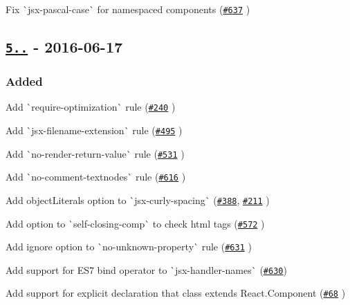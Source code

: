 \begin{DoxyItemize}
\item Fix \`{}jsx-\/pascal-\/case\`{} for namespaced components (\href{https://github.com/yannickcr/eslint-plugin-react/issues/637}{\tt \#637} )
\end{DoxyItemize}

\subsection*{\href{https://github.com/yannickcr/eslint-plugin-react/compare/v5.1.1...v5.2.0}{\tt 5..} -\/ 2016-\/06-\/17}

\subsubsection*{Added}


\begin{DoxyItemize}
\item Add \`{}require-\/optimization\`{} rule (\href{https://github.com/yannickcr/eslint-plugin-react/issues/240}{\tt \#240} )
\item Add \`{}jsx-\/filename-\/extension\`{} rule (\href{https://github.com/yannickcr/eslint-plugin-react/issues/495}{\tt \#495} )
\item Add \`{}no-\/render-\/return-\/value\`{} rule (\href{https://github.com/yannickcr/eslint-plugin-react/issues/531}{\tt \#531} )
\item Add \`{}no-\/comment-\/textnodes\`{} rule (\href{https://github.com/yannickcr/eslint-plugin-react/pull/616}{\tt \#616} )
\item Add {\ttfamily object\+Literals} option to \`{}jsx-\/curly-\/spacing\`{} (\href{https://github.com/yannickcr/eslint-plugin-react/issues/388}{\tt \#388}, \href{https://github.com/yannickcr/eslint-plugin-react/issues/211}{\tt \#211}  )
\item Add option to \`{}self-\/closing-\/comp\`{} to check html tags (\href{https://github.com/yannickcr/eslint-plugin-react/issues/572}{\tt \#572} )
\item Add {\ttfamily ignore} option to \`{}no-\/unknown-\/property\`{} rule (\href{https://github.com/yannickcr/eslint-plugin-react/pull/631}{\tt \#631} )
\item Add support for E\+S7 bind operator to \`{}jsx-\/handler-\/names\`{} (\href{https://github.com/yannickcr/eslint-plugin-react/issues/630}{\tt \#630})
\item Add support for explicit declaration that class extends React.\+Component (\href{https://github.com/yannickcr/eslint-plugin-react/issues/68}{\tt \#68} )
\end{DoxyItemize}

